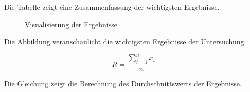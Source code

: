 Die Tabelle zeigt eine Zusammenfassung der wichtigsten Ergebnisse.

\begin{figure}[htbp]
    \centering
    \caption{Visualisierung der Ergebnisse}
    \label{fig:ergebnisse}
\end{figure}

Die Abbildung veranschaulicht die wichtigsten Ergebnisse der Untersuchung.

\begin{equation}
    \label{eq:ergebnis}
    R = \frac{\sum_{i=1}^{n} x_i}{n}
\end{equation}

Die Gleichung zeigt die Berechnung des Durchschnittswerts der Ergebnisse.
